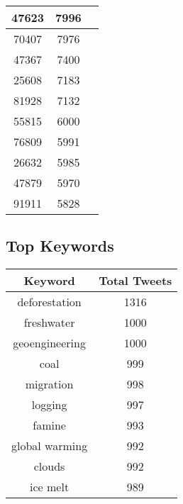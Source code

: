 \documentclass{article}\usepackage[T1]{fontenc}
\begin{document}
\begin{tabular}{|c|c|c|}
 \hline
47623 & 7996\\ 
 \hline
70407 & 7976\\ 
 \hline
47367 & 7400\\ 
 \hline
25608 & 7183\\ 
 \hline
81928 & 7132\\ 
 \hline
55815 & 6000\\ 
 \hline
76809 & 5991\\ 
 \hline
26632 & 5985\\ 
 \hline
47879 & 5970\\ 
 \hline
91911 & 5828\\ 
 \hline
\end{tabular}\subsection*{Top Keywords}\begin{tabular}{|c|c|}         \hline         Keyword & Total Tweets \\ 
 \hline
deforestation & 1316\\ 
 \hline
freshwater & 1000\\ 
 \hline
geoengineering & 1000\\ 
 \hline
coal & 999\\ 
 \hline
migration & 998\\ 
 \hline
logging & 997\\ 
 \hline
famine & 993\\ 
 \hline
global warming & 992\\ 
 \hline
clouds & 992\\ 
 \hline
ice melt & 989\\ 
 \hline
\end{tabular}
\end{document}

